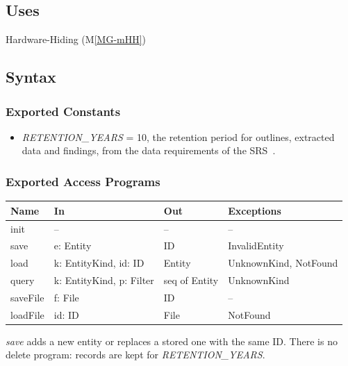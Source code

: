 \documentclass[12pt, titlepage]{article}
\newcommand{\mref}[1]{M\ref{MG-#1}}
\begin{document}
\subsection{Uses}

Hardware-Hiding (\mref{mHH})

\subsection{Syntax}

\subsubsection{Exported Constants}

\begin{itemize}
\item \textit{RETENTION\_YEARS} = 10, the retention period for outlines,
  extracted data and findings, from the data requirements of the
  SRS~\citep{TeamBVSH2026SRS}.
\end{itemize}

\subsubsection{Exported Access Programs}

\begin{center}\small
\begin{tabular}{>{\raggedright\arraybackslash}p{2.2cm} >{\raggedright\arraybackslash}p{4.2cm} >{\raggedright\arraybackslash}p{4.3cm} >{\raggedright\arraybackslash}p{3.9cm}}
\hline
\textbf{Name} & \textbf{In} & \textbf{Out} & \textbf{Exceptions} \\
\hline
init & -- & -- & -- \\
save & e: Entity & ID & InvalidEntity \\
load & k: EntityKind, id: ID & Entity & UnknownKind, NotFound \\
query & k: EntityKind, p: Filter & seq of Entity & UnknownKind \\
saveFile & f: File & ID & -- \\
loadFile & id: ID & File & NotFound \\
\hline
\end{tabular}
\end{center}

\noindent \textit{save} adds a new entity or replaces a stored one with the
same ID. There is no delete program: records are kept for
\textit{RETENTION\_YEARS}.
\end{document}
